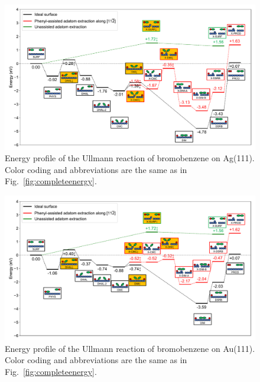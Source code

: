 \documentclass[aps,prb,amsmath,amssymb,11pt]{revtex4-1}
\begin{document}
\begin{figure}[bt]
\centering
\includegraphics[width=1.\textwidth]{Fig/Ag_mainfile.pdf}
\caption{Energy profile of the Ullmann reaction of bromobenzene on Ag(111). Color coding and abbreviations are the same as in Fig.~\ref{fig:completeenergy}.}
\label{fig:Ag_all}
\end{figure}

\begin{figure}[bt]
\centering
\includegraphics[width=1.\textwidth]{Fig/Au_mainfile.pdf}
\caption{Energy profile of the Ullmann reaction of bromobenzene on Au(111). Color coding and abbreviations are the same as in Fig.~\ref{fig:completeenergy}.}
\label{fig:Au_all}
\end{figure}
\end{document}
